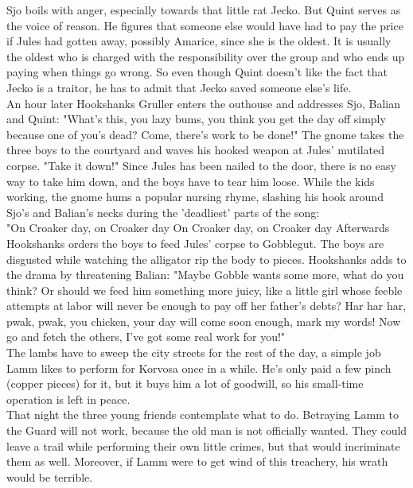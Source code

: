 Sjo boils with anger, especially towards that little rat Jecko. But Quint serves as the voice of reason. He figures that someone else would have had to pay the price if Jules had gotten away, possibly Amarice, since she is the oldest. It is usually the oldest who is charged with the responsibility over the group and who ends up paying when things go wrong. So even though Quint doesn't like the fact that Jecko is a traitor, he has to admit that Jecko saved someone else's life.\\

An hour later Hookshanks Gruller enters the outhouse and addresses Sjo, Balian and Quint: "What's this, you lazy bums, you think you get the day off simply because one of you's dead? Come, there's work to be done!" The gnome takes the three boys to the courtyard and waves his hooked weapon at Jules' mutilated corpse. "Take it down!" Since Jules has been nailed to the door, there is no easy way to take him down, and the boys have to tear him loose. While the kids working, the gnome hums a popular nursing rhyme, slashing his hook around Sjo's and Balian's necks during the 'deadliest' parts of the song:\\

"On Croaker day, on Croaker day   On Croaker day, on Croaker day   Afterwards Hookshanks orders the boys to feed Jules' corpse to Gobblegut. The boys are disgusted while watching the alligator rip the body to pieces. Hookshanks adds to the drama by threatening Balian: "Maybe Gobble wants some more, what do you think? Or should we feed him something more juicy, like a little girl whose feeble attempts at labor will never be enough to pay off her father's debts? Har har har, pwak, pwak, you chicken, your day will come soon enough, mark my words! Now go and fetch the others, I've got some real work for you!"\\

The lambs have to sweep the city streets for the rest of the day, a simple job Lamm likes to perform for Korvosa once in a while. He's only paid a few pinch (copper pieces) for it, but it buys him a lot of goodwill, so his small-time operation is left in peace.\\

That night the three young friends contemplate what to do. Betraying Lamm to the Guard will not work, because the old man is not officially wanted. They could leave a trail while performing their own little crimes, but that would incriminate them as well. Moreover, if Lamm were to get wind of this treachery, his wrath would be terrible.\\

